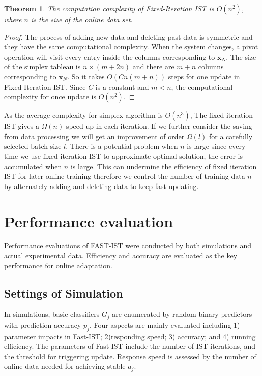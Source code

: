 \documentclass[letterpaper]{article}
\newtheorem{theorem}{Theorem}
\begin{document}
\begin{theorem}
The computation complexity of Fixed-Iteration IST is $O(n^2)$, where $n$ is the size of the online data set.
\end{theorem}
\begin{proof}
The process of adding new data and deleting past data is symmetric and they have the same computational complexity. When the system changes, a pivot operation will visit every entry inside the columns corresponding to $\mathbf{x}_N$. The size of the simplex tableau is $n \times (m + 2n)$ and there are $m + n$ columns corresponding to $\mathbf{x}_N$. So it takes $O(Cn(m+n))$ steps for one update in Fixed-Iteration IST. Since $C$ is a constant and $m < n$, the computational complexity for once update is $O(n^2)$.
\end{proof}
As the average complexity for simplex algorithm is $O(n^3)$, The fixed iteration IST gives a $\Omega(n)$ speed up in each iteration. If we further consider the saving from data processing we will get an improvement of order $\Omega(l)$ for a carefully selected batch size $l$. There is a potential problem when $n$ is large since every time we use fixed iteration IST to approximate optimal solution, the error is accumulated when $n$ is large. This can undermine the efficiency of fixed iteration IST for later online training therefore we control the number of training data $n$ by alternately adding and deleting data to keep fast updating.

\section{Performance evaluation}
Performance evaluations of FAST-IST were conducted by both simulations and actual experimental data. Efficiency and accuracy are evaluated as the key performance for online adaptation.
\subsection{Settings of Simulation}
In simulations, basic classifiers ${G_j}$ are enumerated by random binary predictors with prediction accuracy ${p_j}$. Four aspects are mainly evaluated including 1) parameter impacts in Fast-IST; 2)responding speed;  3) accuracy;  and 4) running efficiency. The parameters of Fast-IST include the number of IST iterations, and the threshold for triggering update. Response speed is assessed by the number of online data needed for achieving stable ${a_j}$. %
\end{document}
